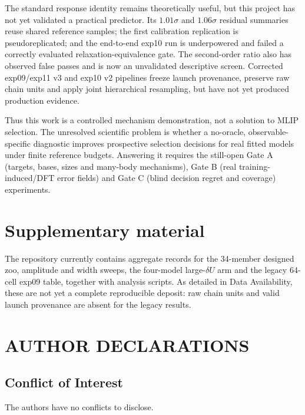 \documentclass[aip,jcp,reprint,amsmath,amssymb,floatfix]{revtex4-2}
\newcommand{\dU}{\ensuremath{\delta U}}
\begin{document}
The standard response identity remains theoretically useful, but this project
has not yet validated a practical predictor. Its $1.01\sigma$ and
$1.06\sigma$ residual summaries reuse shared reference samples; the first
calibration replication is pseudoreplicated; and the end-to-end exp10 run is
underpowered and failed a correctly evaluated relaxation-equivalence gate. The
second-order ratio also has observed false passes and is now an unvalidated
descriptive screen. Corrected exp09/exp11 v3 and exp10 v2 pipelines freeze launch provenance, preserve
raw chain units and apply joint hierarchical resampling, but have not yet
produced production evidence.

Thus this work is a controlled mechanism demonstration, not a solution to MLIP
selection. The unresolved scientific problem is whether a no-oracle,
observable-specific diagnostic improves prospective selection decisions for
real fitted models under finite reference budgets. Answering it requires the
still-open Gate A (targets, bases, sizes and many-body mechanisms), Gate B (real
training-induced/DFT error fields) and Gate C (blind decision regret and
coverage) experiments.

\section{Supplementary material}

The repository currently contains aggregate records for the 34-member designed
zoo, amplitude and width sweeps, the four-model large-$\dU$ arm and the legacy
64-cell exp09 table, together with analysis scripts. As detailed in Data
Availability, these are not yet a complete reproducible deposit: raw chain units
and valid launch provenance are absent for the legacy results.

\begin{acknowledgments}
\end{acknowledgments}

\section*{AUTHOR DECLARATIONS}

\subsection*{Conflict of Interest}
The authors have no conflicts to disclose.
\end{document}

